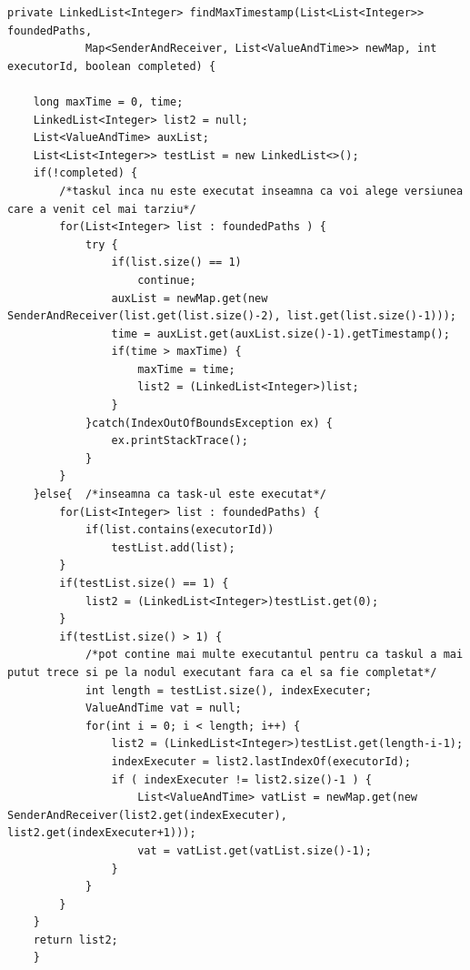 \documentclass[12pt,a4paper]{report}
\begin{document}
\begin{lstlisting}[label={alg:findMaxTimestamp},caption={Aflarea versiunii potrivite}]
private LinkedList<Integer> findMaxTimestamp(List<List<Integer>> foundedPaths,
			Map<SenderAndReceiver, List<ValueAndTime>> newMap, int executorId, boolean completed) {
			
	long maxTime = 0, time;
	LinkedList<Integer> list2 = null;
	List<ValueAndTime> auxList;
	List<List<Integer>> testList = new LinkedList<>();
	if(!completed) {		
		/*taskul inca nu este executat inseamna ca voi alege versiunea care a venit cel mai tarziu*/
		for(List<Integer> list : foundedPaths ) {
			try {
				if(list.size() == 1)
					continue;
				auxList = newMap.get(new SenderAndReceiver(list.get(list.size()-2), list.get(list.size()-1)));		
				time = auxList.get(auxList.size()-1).getTimestamp(); 
				if(time > maxTime) {
					maxTime = time;
					list2 = (LinkedList<Integer>)list;
				}
			}catch(IndexOutOfBoundsException ex) {
				ex.printStackTrace();
			}
		}
	}else{	/*inseamna ca task-ul este executat*/
		for(List<Integer> list : foundedPaths) {
			if(list.contains(executorId))
				testList.add(list);
		}
		if(testList.size() == 1) {
			list2 = (LinkedList<Integer>)testList.get(0);
		}
		if(testList.size() > 1) {		
			/*pot contine mai multe executantul pentru ca taskul a mai putut trece si pe la nodul executant fara ca el sa fie completat*/
			int length = testList.size(), indexExecuter;
			ValueAndTime vat = null;
			for(int i = 0; i < length; i++) {	
				list2 = (LinkedList<Integer>)testList.get(length-i-1);
				indexExecuter = list2.lastIndexOf(executorId);
				if ( indexExecuter != list2.size()-1 ) {
					List<ValueAndTime> vatList = newMap.get(new SenderAndReceiver(list2.get(indexExecuter), list2.get(indexExecuter+1)));
					vat = vatList.get(vatList.size()-1);
				}	
			}
		}	
	}
	return list2;
	}
\end{lstlisting}
\end{document}
